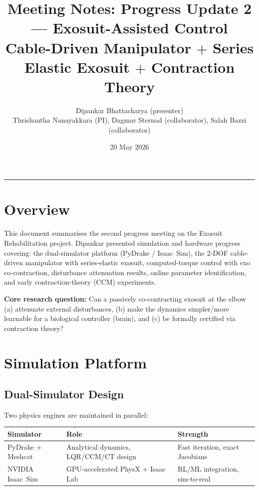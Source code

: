 \documentclass[11pt, a4paper]{article}
\title{\textbf{Meeting Notes: Progress Update 2 --- Exosuit-Assisted Control}\\[4pt]
       \large Cable-Driven Manipulator $+$ Series Elastic Exosuit $+$ Contraction Theory}
\author{Dipankar Bhattacharya (presenter) \\
        Thrishantha Nanayakkara (PI), Dagmar Sternad (collaborator), Salah Bazzi (collaborator)}
\date{20 May 2026}
\begin{document}
\maketitle
\tableofcontents
\vspace{0.5cm}
\hrule
\vspace{0.4cm}

\section{Overview}

This document summarises the second progress meeting on the Exosuit Rehabilitation project.
Dipankar presented simulation and hardware progress covering: the dual-simulator platform
(PyDrake / Isaac~Sim), the 2-DOF cable-driven manipulator with series-elastic exosuit,
computed-torque control with exo co-contraction, disturbance attenuation results, online
parameter identification, and early contraction-theory (CCM) experiments.

\begin{infobox}
\textbf{Core research question:} Can a passively co-contracting exosuit at the elbow
(a) attenuate external disturbances, (b) make the dynamics simpler/more learnable for a
biological controller (brain), and (c) be formally certified via contraction theory?
\end{infobox}

\section{Simulation Platform}

\subsection{Dual-Simulator Design}

Two physics engines are maintained in parallel:

\begin{center}
\begin{tabular}{lll}
\toprule
\textbf{Simulator} & \textbf{Role} & \textbf{Strength} \\
\midrule
PyDrake + Meshcat & Analytical dynamics, LQR/CCM/CT design & Fast iteration, exact Jacobians \\
NVIDIA Isaac~Sim  & GPU-accelerated PhysX + Isaac Lab & RL/ML integration, sim-to-real \\
\bottomrule
\end{tabular}
\end{center}
\end{document}
